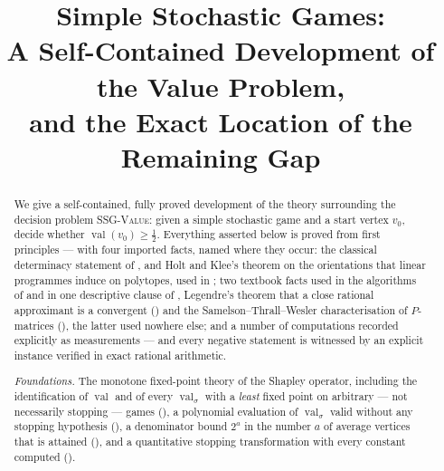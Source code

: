 \documentclass[11pt]{article}
\title{Simple Stochastic Games:\\
A Self-Contained Development of the Value Problem,\\
and the Exact Location of the Remaining Gap}
\author{}
\date{}
\theoremstyle{plain}
\theoremstyle{definition}
\DeclareMathOperator{\val}{val}
\begin{document}
\maketitle

\begin{abstract}
We give a self-contained, fully proved development of the theory
surrounding the decision problem \textsc{SSG-Value}: given a simple
stochastic game and a start vertex $v_0$, decide whether
$\val(v_0)\ge\tfrac12$. Everything asserted below is proved from first
principles --- with four imported facts, named where they occur: the
classical determinacy statement of , and Holt and
Klee's theorem on the orientations that linear programmes induce on
polytopes, used in ; two textbook facts used in
the algorithms of  and in one descriptive clause of
, Legendre's theorem that a close rational
approximant is a convergent () and the
Samelson--Thrall--Wesler characterisation of $P$-matrices
(), the latter used nowhere else; and a number of
computations recorded explicitly as measurements --- and every negative
statement is witnessed by an explicit instance verified in exact rational
arithmetic.

\emph{Foundations.} The monotone fixed-point theory of the Shapley
operator, including the identification of $\val$ and of every
$\val_\sigma$ with a \emph{least} fixed point on arbitrary --- not
necessarily stopping --- games (), a polynomial
evaluation of $\val_\sigma$ valid without any stopping hypothesis
(), a denominator bound $2^{a}$ in the number $a$
of average vertices that is attained (), and
a quantitative stopping transformation with every constant computed
().


\end{abstract}
\end{document}
